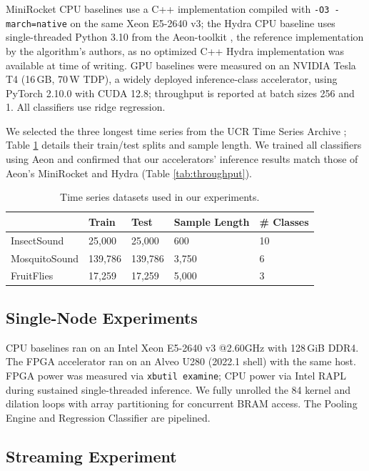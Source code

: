 MiniRocket CPU baselines use a C++ implementation compiled with \texttt{-O3 -march=native} on the same Xeon E5-2640 v3; the Hydra CPU baseline uses single-threaded Python 3.10 from the Aeon-toolkit \cite{aeon-arxiv, aeon-pkdd}, the reference implementation by the algorithm's authors, as no optimized C++ Hydra implementation was available at time of writing. GPU baselines were measured on an NVIDIA Tesla T4 (16\,GB, 70\,W TDP), a widely deployed inference-class accelerator, using PyTorch 2.10.0 with CUDA 12.8; throughput is reported at batch sizes 256 and 1. All classifiers use ridge regression.

We selected the three longest time series from the UCR Time Series Archive \cite{UCRTimeSeries}; Table \ref{tab:datasets} details their train/test splits and sample length. We trained all classifiers using Aeon and confirmed that our accelerators' inference results match those of Aeon's MiniRocket and Hydra (Table \ref{tab:throughput}).

\begin{table}[b]
\caption{Time series datasets used in our experiments.}
\begin{tabular}{|l|l|l|l|l|}
\hline
                    & Train    & Test      & Sample Length & \# Classes \\\hline
InsectSound         & 25,000    & 25,000     & 600    & 10 \\ \hline
MosquitoSound       & 139,786   & 139,786    & 3,750   & 6 \\ \hline
FruitFlies          & 17,259    & 17,259     & 5,000   & 3\\ \hline
\end{tabular}
\label{tab:datasets}
\end{table}

\subsection{Single-Node Experiments}
\label{sec:single_node_experiments}

CPU baselines ran on an Intel Xeon E5-2640 v3 @2.60GHz with 128\,GiB DDR4. The FPGA accelerator ran on an Alveo U280 (2022.1 shell) with the same host. FPGA power was measured via \texttt{xbutil examine}; CPU power via Intel RAPL during sustained single-threaded inference. We fully unrolled the 84 kernel and dilation loops with array partitioning for concurrent BRAM access. The Pooling Engine and Regression Classifier are pipelined.

\subsection{Streaming Experiment}
\label{sec:streaming_experiments}

